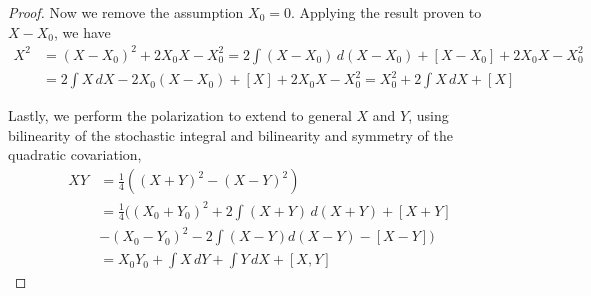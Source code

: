 \begin{proof}
Now we remove the assumption $X_0 = 0$.  Applying the result proven to $X - X_0$, we have
\begin{align*}
X^2 &= (X-X_0)^2 + 2X_0X - X_0^2 = 2 \int (X - X_0) \, d(X - X_0) + [X-X_0] + 2X_0 X - X_0^2 \\
&= 2 \int X \, dX - 2X_0 (X-X_0) + [X] + 2X_0 X - X_0^2 = X_0^2 + 2 \int X \, dX + [X]
\end{align*}

Lastly, we perform the polarization to extend to general $X$ and $Y$, using bilinearity of the stochastic integral and bilinearity and symmetry of the quadratic covariation,
\begin{align*}
XY &= \frac{1}{4} \left( (X + Y)^2 - (X-Y)^2 \right) \\
&=\frac{1}{4} \bigl( (X_0 + Y_0)^2 + 2\int (X+Y) \, d(X+Y) + [X+Y] \\
&- (X_0-Y_0)^2 - 2\int (X-Y) d(X-Y) - [X-Y] \bigr) \\
&=X_0 Y_0 + \int X \, dY + \int Y \, dX + [X,Y]
\end{align*}
\end{proof}

